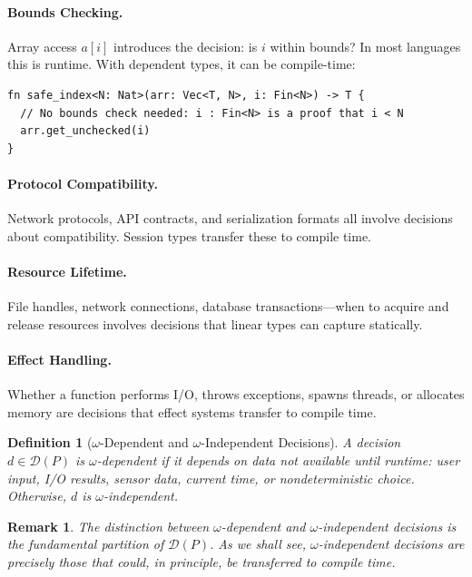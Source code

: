\documentclass[11pt]{article}
\newtheorem{definition}[theorem]{Definition}
\newtheorem{remark}[theorem]{Remark}
\newcommand{\DP}{\mathcal{D}(P)}
\begin{document}
\paragraph{Bounds Checking.}
Array access $a[i]$ introduces the decision: is $i$ within bounds? In most languages
this is runtime. With dependent types, it can be compile-time:

\begin{lstlisting}[caption={Bounds checking as a compile-time decision in JAPL}]
fn safe_index<N: Nat>(arr: Vec<T, N>, i: Fin<N>) -> T {
  // No bounds check needed: i : Fin<N> is a proof that i < N
  arr.get_unchecked(i)
}
\end{lstlisting}

\paragraph{Protocol Compatibility.}
Network protocols, API contracts, and serialization formats all involve decisions about
compatibility. Session types transfer these to compile time.

\paragraph{Resource Lifetime.}
File handles, network connections, database transactions---when to acquire and release
resources involves decisions that linear types can capture statically.

\paragraph{Effect Handling.}
Whether a function performs I/O, throws exceptions, spawns threads, or allocates memory
are decisions that effect systems transfer to compile time.

\begin{definition}[$\omega$-Dependent and $\omega$-Independent Decisions]
\label{def:omega}
A decision $d \in \DP$ is \emph{$\omega$-dependent} if it depends on data not
available until runtime: user input, I/O results, sensor data, current time, or
nondeterministic choice. Otherwise, $d$ is \emph{$\omega$-independent}.
\end{definition}

\begin{remark}
The distinction between $\omega$-dependent and $\omega$-independent decisions is the
fundamental partition of $\DP$. As we shall see, $\omega$-independent decisions are
precisely those that \emph{could}, in principle, be transferred to compile time.
\end{remark}
\end{document}
